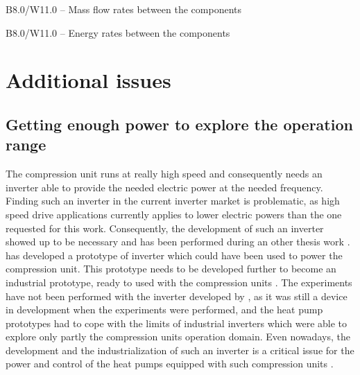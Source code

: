 \begin{table}[htbp]
    \footnotesize
    \begin{center}
      
    \end{center}
    \caption{B8.0/W11.0 -- Mass flow rates between the components}
    \label{tab:bwp-B8.0/W11.0-mf}
\end{table}

\begin{table}[htbp]
    \footnotesize
    \begin{center}
    
  \end{center}
  \caption{B8.0/W11.0 -- Energy rates between the components}
  \label{tab:B8.0/W11.0-energy-flows}
\end{table}

\section{Additional issues}
\label{sec:bwp-issues}

\subsection{Getting enough power to explore the operation range}
\label{sec:bwp-issue-power}

The compression unit runs at really high speed and consequently needs
an inverter able to provide the needed electric power at the needed
frequency. Finding such an inverter in the current inverter market is
problematic, as high speed drive applications currently applies to
lower electric powers than the one requested for this
work. Consequently, the development of such an inverter
showed up to be necessary and has been performed during an other
thesis work \citep{rod-2012a}. \citet[fig. 6.6, p.\,118]{rod-2012a}
has developed a prototype of inverter which could have been used to
power the compression unit. This prototype needs to be developed
further to become an industrial prototype, ready to used with the
compression units \citep[p.\,134]{rod-2012a}. The experiments have not
been performed with the inverter developed by \citet{rod-2012a}, as it
was still a device in development when the experiments were performed,
and the heat pump prototypes had to cope with the limits of industrial
inverters which were able to explore only partly the compression units
operation domain. Even nowadays, the development and the
industrialization of such an inverter is a critical issue for the
power and control of the heat pumps equipped with such compression
units \citep[p.\,135]{rod-2012a}.

